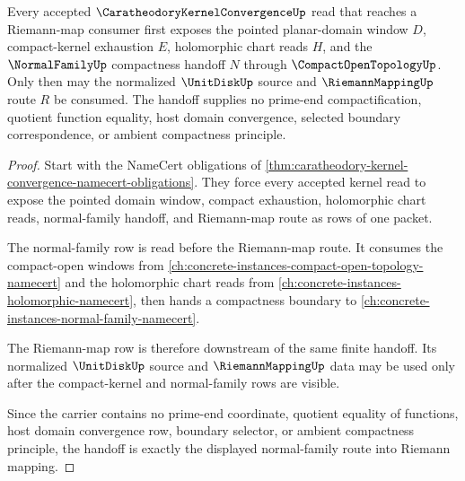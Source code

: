 \begin{theorem}
\label{thm:caratheodory-kernel-convergence-normal-family-handoff}
Every accepted $\CaratheodoryKernelConvergenceUp$ read that reaches a Riemann-map consumer first exposes the pointed planar-domain window $D$, compact-kernel exhaustion $E$, holomorphic chart reads $H$, and the $\NormalFamilyUp$ compactness handoff $N$ through $\CompactOpenTopologyUp$. Only then may the normalized $\UnitDiskUp$ source and $\RiemannMappingUp$ route $R$ be consumed. The handoff supplies no prime-end compactification, quotient function equality, host domain convergence, selected boundary correspondence, or ambient compactness principle.
\end{theorem}
\begin{proof}
Start with the NameCert obligations of \autoref{thm:caratheodory-kernel-convergence-namecert-obligations}. They force every accepted kernel read to expose the pointed domain window, compact exhaustion, holomorphic chart reads, normal-family handoff, and Riemann-map route as rows of one packet.

The normal-family row is read before the Riemann-map route. It consumes the compact-open windows from \autoref{ch:concrete-instances-compact-open-topology-namecert} and the holomorphic chart reads from \autoref{ch:concrete-instances-holomorphic-namecert}, then hands a compactness boundary to \autoref{ch:concrete-instances-normal-family-namecert}.

The Riemann-map row is therefore downstream of the same finite handoff. Its normalized $\UnitDiskUp$ source and $\RiemannMappingUp$ data may be used only after the compact-kernel and normal-family rows are visible.

Since the carrier contains no prime-end coordinate, quotient equality of functions, host domain convergence row, boundary selector, or ambient compactness principle, the handoff is exactly the displayed normal-family route into Riemann mapping.
\end{proof}


